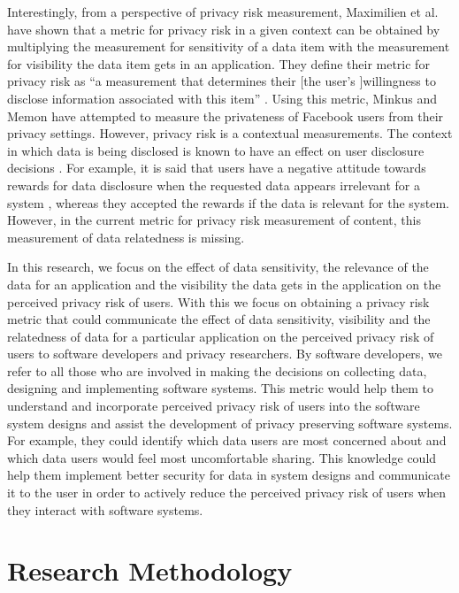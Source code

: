 \documentclass[10pt]{article}
\begin{document}
Interestingly, from a perspective of privacy risk measurement, Maximilien et al. \cite {maximilien2009privacy} have shown that a metric for privacy risk in a given context can be obtained by multiplying the measurement for sensitivity of a data item with the measurement for visibility the data item gets in an application. They define their metric for privacy risk as \enquote{a measurement that determines their [the user's ]willingness to disclose information associated with this item} \cite {maximilien2009privacy}. Using this metric, Minkus and Memon \cite{minkus2014scale} have attempted to measure the privateness of Facebook users from their privacy settings. However, privacy risk is a contextual measurements. The context in which data is being disclosed \cite {nissenbaum2009privacy, john2010strangers} is known to have an effect on user disclosure decisions \cite {knijnenburg2013making}. For example, it is said that users have a negative attitude towards rewards for data disclosure when the requested data appears irrelevant for a system \cite {li2010understanding}, whereas they accepted the rewards if the data is relevant for the system. However, in the current metric for privacy risk measurement of content, this measurement of data relatedness is missing.

In this research, we focus on the effect of data sensitivity, the relevance of the data for an application and the visibility the data gets in the application on the perceived privacy risk of users. With this we focus on obtaining a privacy risk metric that could communicate the effect of data sensitivity, visibility and the relatedness of data for a particular application on the perceived privacy risk of users to software developers and privacy researchers. By software developers, we refer to all those who are involved in making the decisions on collecting data, designing and implementing software systems. This metric would help them to understand and incorporate perceived privacy risk of users into the software system designs and assist the development of privacy preserving software systems. For example, they could identify which data users are most concerned about and which data users would feel most uncomfortable sharing. This knowledge could help them implement better security for data in system designs and communicate it to the user in order to actively reduce the perceived privacy risk of users when they interact with software systems.


\section {Research Methodology}
\end{document}
